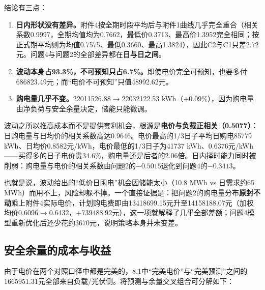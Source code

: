 \documentclass[UTF8,12pt]{ctexart}
\begin{document}
结论有三点：
\begin{enumerate}
\item \textbf{日内形状没有差异。}附件4按全期时段平均后与附件1曲线几乎完全重合（相关系数0.9997，全期均值均为0.7662，最低价0.3713、最高价1.3952完全相同；按正式期平均则为均值0.7575、最低0.3660、最高1.3824），因此C2与C1只差2.72元。问题4与问题2的全部差异都在\textbf{日与日之间}。
\item \textbf{波动本身占93.3\%，不可预知只占6.7\%。}即使电价完全可预知，也要多付686823.49元；而“电价不可预知”只值48992.62元。
\item \textbf{购电量几乎不变。}22011526.88$\to$22032122.53 kWh（$+0.09\%$），因为购电量由净负荷与安全余量决定，储能只能微调。
\end{enumerate}

波动之所以推高成本而不是提供套利机会，根源是\textbf{电价与负载正相关（0.5077）}：日购电量与日均价的相关系数高达0.9646。电价最高的1/3日子平均日购电85779 kWh、日均价0.8582元/kWh，电价最低的1/3日子为41737 kWh、0.6376元/kWh——买得多的日子电价贵34.6\%，购电量还是后者的2.06倍。日内择时能力同时被削弱：购电量与电价的相关系数由问题2的$-0.5015$退化到问题4的$-0.3413$。

也就是说，波动给出的“低价日囤电”机会因储能太小（10.8 MWh vs 日需求约65 MWh）而用不上，风险却躲不掉。一个直接证据是：把问题2的购电量分布\textbf{原封不动}乘上附件4实际电价，计划购电费即由13418699.15元升至14158188.07元（加权均价0.6096$\to$0.6432，$+739488.92$元），这一项就解释了几乎全部差额；问题4模型重新优化后还少花约3670元，说明策略本身并未变差。

\subsection{安全余量的成本与收益}
由于电价在两个对照口径中都是完美的，8.1中“完美电价”与“完美预测”之间的1665951.31元全部来自负载/光伏侧。将预测与余量交叉组合可分解如下：
\begin{table}[H]\centering\small
\caption{预测误差与安全余量的四口径交叉}
\end{table}
\end{document}
